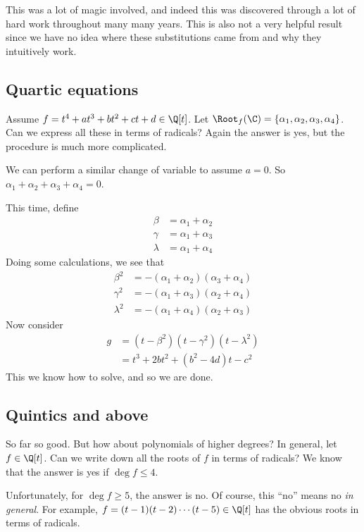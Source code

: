 \documentclass[a4paper]{article}
\begin{document}
This was a lot of magic involved, and indeed this was discovered through a lot of hard work throughout many many years. This is also not a very helpful result since we have no idea where these substitutions came from and why they intuitively work.

\subsection{Quartic equations}
Assume $f = t^4 + at^3 + bt^2 + ct + d\in \Q[t]$. Let $\Root_f(\C) = \{\alpha_1, \alpha_2, \alpha_3, \alpha_4\}$. Can we express all these in terms of radicals? Again the answer is yes, but the procedure is much more complicated.

We can perform a similar change of variable to assume $a = 0$. So $\alpha_1 + \alpha_2 + \alpha_3 + \alpha_4 = 0$.

This time, define
\begin{align*}
  \beta &= \alpha_1 + \alpha_2\\
  \gamma &= \alpha_1 + \alpha_3\\
  \lambda &= \alpha_1 + \alpha_4
\end{align*}
Doing some calculations, we see that
\begin{align*}
  \beta^2 &= -(\alpha_1 + \alpha_2)(\alpha_3 + \alpha_4)\\
  \gamma^2 &= -(\alpha_1 + \alpha_3)(\alpha_2 + \alpha_4)\\
  \lambda^2 &= -(\alpha_1 + \alpha_4)(\alpha_2 + \alpha_3)
\end{align*}
Now consider
\begin{align*}
  g &= (t - \beta^2)(t - \gamma^2)(t - \lambda^2)\\
  &= t^3 + 2bt^2 + (b^2 - 4d)t - c^2
\end{align*}
This we know how to solve, and so we are done.

\subsection{Quintics and above}
So far so good. But how about polynomials of higher degrees? In general, let $f \in \Q[t]$. Can we write down all the roots of $f$ in terms of radicals? We know that the answer is yes if $\deg f \leq 4$.

Unfortunately, for $\deg f \geq 5$, the answer is no. Of course, this ``no'' means no \emph{in general}. For example, $f = (t - 1)(t - 2) \cdots (t - 5)\in \Q[t]$ has the obvious roots in terms of radicals.
\end{document}
